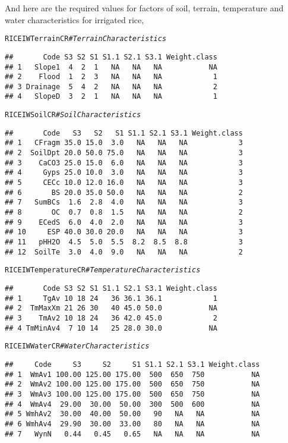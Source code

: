 \documentclass[11pt,fleqn]{article}\usepackage[]{graphicx}\usepackage[]{color}
\makeatletter
\newcommand{\hlcom}[1]{\textcolor[rgb]{0.678,0.584,0.686}{\textit{#1}}}%
\newcommand{\hlstd}[1]{\textcolor[rgb]{0.345,0.345,0.345}{#1}}%
\newenvironment{kframe}{%
 \def\at@end@of@kframe{}%
 \ifinner\ifhmode%
  \def\at@end@of@kframe{\end{minipage}}%
  \begin{minipage}{\columnwidth}%
 \fi\fi%
 \def\FrameCommand##1{\hskip\@totalleftmargin \hskip-\fboxsep
 \colorbox{shadecolor}{##1}\hskip-\fboxsep
     \hskip-\linewidth \hskip-\@totalleftmargin \hskip\columnwidth}%
 \MakeFramed {\advance\hsize-\width
   \@totalleftmargin\z@ \linewidth\hsize
   \@setminipage}}%
 {\par\unskip\endMakeFramed%
 \at@end@of@kframe}
\newenvironment{knitrout}{}{} %
\makeatother
\begin{document}
\noindent And here are the required values for factors of soil, terrain, temperature and water characteristics for irrigated rice,
\begin{knitrout}
\color{fgcolor}\begin{kframe}
\begin{alltt}
\hlstd{RICEIWTerrainCR} \hlcom{# Terrain Characteristics}
\end{alltt}
\begin{verbatim}
##       Code S3 S2 S1 S1.1 S2.1 S3.1 Weight.class
## 1   Slope1  4  2  1   NA   NA   NA           NA
## 2    Flood  1  2  3   NA   NA   NA            1
## 3 Drainage  5  4  2   NA   NA   NA            2
## 4   SlopeD  3  2  1   NA   NA   NA            1
\end{verbatim}
\begin{alltt}
\hlstd{RICEIWSoilCR} \hlcom{# Soil Characteristics}
\end{alltt}
\begin{verbatim}
##       Code   S3   S2   S1 S1.1 S2.1 S3.1 Weight.class
## 1   CFragm 35.0 15.0  3.0   NA   NA   NA            3
## 2  SoilDpt 20.0 50.0 75.0   NA   NA   NA            3
## 3    CaCO3 25.0 15.0  6.0   NA   NA   NA            3
## 4     Gyps 25.0 10.0  3.0   NA   NA   NA            3
## 5     CECc 10.0 12.0 16.0   NA   NA   NA            3
## 6       BS 20.0 35.0 50.0   NA   NA   NA            2
## 7   SumBCs  1.6  2.8  4.0   NA   NA   NA            3
## 8       OC  0.7  0.8  1.5   NA   NA   NA            2
## 9    ECedS  6.0  4.0  2.0   NA   NA   NA            3
## 10     ESP 40.0 30.0 20.0   NA   NA   NA            3
## 11   pHH2O  4.5  5.0  5.5  8.2  8.5  8.8            3
## 12  SoilTe  3.0  4.0  9.0   NA   NA   NA            2
\end{verbatim}
\begin{alltt}
\hlstd{RICEIWTemperatureCR} \hlcom{# Temperature Characteristics}
\end{alltt}
\begin{verbatim}
##       Code S3 S2 S1 S1.1 S2.1 S3.1 Weight.class
## 1     TgAv 10 18 24   36 36.1 36.1            1
## 2  TmMaxXm 21 26 30   40 45.0 50.0           NA
## 3    TmAv2 10 18 24   36 42.0 45.0            2
## 4 TmMinAv4  7 10 14   25 28.0 30.0           NA
\end{verbatim}
\begin{alltt}
\hlstd{RICEIWWaterCR} \hlcom{# Water Characteristics}
\end{alltt}
\begin{verbatim}
##     Code     S3     S2     S1 S1.1 S2.1 S3.1 Weight.class
## 1  WmAv1 100.00 125.00 175.00  500  650  750           NA
## 2  WmAv2 100.00 125.00 175.00  500  650  750           NA
## 3  WmAv3 100.00 125.00 175.00  500  650  750           NA
## 4  WmAv4  29.00  30.00  50.00  300  500  600           NA
## 5 WmhAv2  30.00  40.00  50.00   90   NA   NA           NA
## 6 WmhAv4  29.90  30.00  33.00   80   NA   NA           NA
## 7   WynN   0.44   0.45   0.65   NA   NA   NA           NA
\end{verbatim}
\end{kframe}
\end{knitrout}
\end{document}
